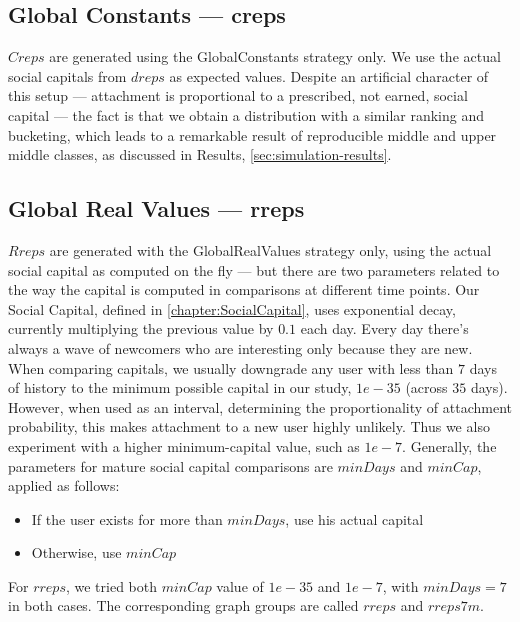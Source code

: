 \documentclass[10pt,oneside]{memoir}
\begin{document}
\subsection{Global Constants --- creps}
\label{globalconstantscreps}

$Creps$ are generated using the GlobalConstants strategy only.  We use the actual social capitals from $dreps$ as expected values.  Despite an artificial character of this setup --- attachment is proportional to a prescribed, not earned, social capital --- the fact is that we obtain a distribution with a similar ranking and bucketing, which leads to a remarkable result of reproducible middle and upper middle classes, as discussed in Results, \ref{sec:simulation-results}.


\subsection{Global Real Values --- rreps}
\label{globalrealvaluesrreps}

$Rreps$ are generated with the GlobalRealValues strategy only, using the actual social capital as computed on the fly --- but there are two parameters related to the way the capital is computed in comparisons at different time points.  Our Social Capital, defined in \ref{chapter:SocialCapital}, uses exponential decay, currently multiplying the previous value by $0.1$ each day.  Every day there's always a wave of newcomers who are interesting only because they are new.  When comparing capitals, we usually downgrade any user with less than $7$ days of history to the minimum possible capital in our study, $1e-35$ (across $35$ days).  However, when used as an interval, determining the proportionality of attachment probability, this makes attachment to a new user highly unlikely.  Thus we also experiment with a higher minimum-capital value, such as $1e-7$.  Generally, the parameters for mature social capital comparisons are $minDays$ and $minCap$, applied as follows:


\begin{itemize}


\item If the user exists for more than $minDays$, use his actual capital

\item Otherwise, use $minCap$
\end{itemize}

For $rreps$, we tried both $minCap$ value of $1e-35$ and $1e-7$, with $minDays = 7$ in both cases.  The corresponding graph groups are called $rreps$ and $rreps7m$.
\end{document}
